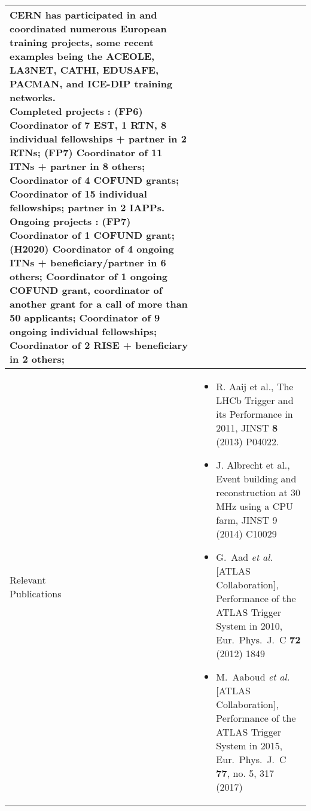 \begin{center}
{\begin{tabular}{@{}p{25mm}|p{190mm}@{}}
{CERN has participated in and coordinated numerous European training projects, some recent examples being the ACEOLE, LA3NET, CATHI, EDUSAFE, PACMAN, and ICE-DIP training networks.\\
Completed projects : (FP6) Coordinator of 7 EST, 1 RTN, 8 individual fellowships + partner in 2 RTNs; (FP7) Coordinator of 11 ITNs + partner in 8 others; Coordinator of 4 COFUND grants; Coordinator of 15 individual fellowships; partner in 2 IAPPs. 
Ongoing projects : (FP7) Coordinator of 1 COFUND grant; (H2020) Coordinator of 4 ongoing ITNs + beneficiary/partner in 6 others; Coordinator of 1 ongoing COFUND grant, coordinator of another grant for a call of more than 50 applicants; Coordinator of 9 ongoing individual fellowships; Coordinator of 2 RISE + beneficiary in 2 others;
}\tabularnewline\hline
\pbox{8cm}{\Tstrut Relevant\\Publications} &%
{\vspace{-3mm}
\begin{itemize}%
\item R. Aaij et al., The LHCb Trigger and its Performance in 2011, JINST {\bf 8} (2013) P04022.
\item J. Albrecht et al., Event building and reconstruction at 30 MHz using a CPU farm, JINST 9 (2014) C10029
\item G.~Aad {\it et al.} [ATLAS Collaboration], Performance of the ATLAS Trigger System in 2010, Eur.\ Phys.\ J.\ C {\bf 72} (2012) 1849
\item M.~Aaboud {\it et al.} [ATLAS Collaboration], Performance of the ATLAS Trigger System in 2015, Eur.\ Phys.\ J.\ C {\bf 77}, no. 5, 317 (2017)
\vspace{-4mm}
\end{itemize}
}\tabularnewline\hline
\end{tabular}
}%
\end{center}